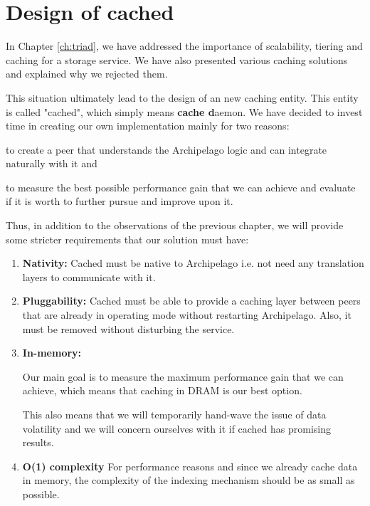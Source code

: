 \chapter{Design of cached}\label{ch:cached-design}

In Chapter \ref{ch:triad}, we have addressed the importance of scalability, 
tiering and caching for a storage service. We have also presented various 
caching solutions and explained why we rejected them.

This situation ultimately lead to the design of an new caching entity. This 
entity is called "cached", which simply means \textbf{cache d}aemon. We have 
decided to invest time in creating our own implementation mainly for two 
reasons:
\begin{inparaenum}[i)]
\item to create a peer that understands the Archipelago logic and can integrate 
	naturally with it and
\item to measure the best possible performance gain that we can achieve and 
	evaluate if it is worth to further pursue and improve upon it.
\end{inparaenum}

Thus, in addition to the observations of the previous chapter, we will provide 
some stricter requirements that our solution must have:

\begin{enumerate}
	\item \textbf{Nativity:} Cached must be native to Archipelago i.e.  not 
		need any translation layers to communicate with it.
	\item \textbf{Pluggability:} Cached must be able to provide a caching 
		layer between peers that are already in operating mode without 
		restarting Archipelago. Also, it must be removed without 
		disturbing the service.
	\item \textbf{In-memory:}
		\begin{comment}
		Our solution must cache requests in RAM, since the next fastest 
		tier, SSDs, are already being used in RADOS as a 
		journal.
		\end{comment}
		Our main goal is to measure the maximum performance gain that 
		we can achieve, which means that caching in DRAM is our best 
		option.
		
		This also means that we will temporarily hand-wave the issue of 
		data volatility and we will concern ourselves with it if cached 
		has promising results.
	\item \textbf{O(1) complexity} For performance reasons and since we 
		already cache data in memory, the complexity of the indexing 
		mechanism should be as small as possible.
\end{enumerate}

